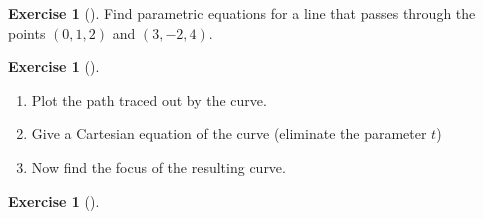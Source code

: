 \documentclass[10pt,]{book}
\theoremstyle{plain}
\theoremstyle{definition}
\theoremstyle{definition}
\theoremstyle{definition}
\theoremstyle{definition}
\newtheorem{exploration}[project]{Exercise}
\theoremstyle{definition}
\numberwithin{equation}{section}
\begin{document}
\begin{exploration}[]\label{prob_line_equation_practice}
Find parametric equations for a line that passes through the points \((0,1,2)\) and \((3,-2,4)\).%
\end{exploration}
\begin{exploration}[]\label{exploration-75}
\leavevmode%
\begin{enumerate}[font=\bfseries,label=(\alph*),ref=\alph*]
\item\label{task-122} Plot the path traced out by the curve.%
\item\label{task-123} Give a Cartesian equation of the curve (eliminate the parameter \(t\))%
\item\label{task-124} Now find the focus of the resulting curve.%
\end{enumerate}
\end{exploration}
\begin{exploration}[]\label{exploration-76}
\end{exploration}
\typeout{************************************************}
\typeout{************************************************}
\end{document}
